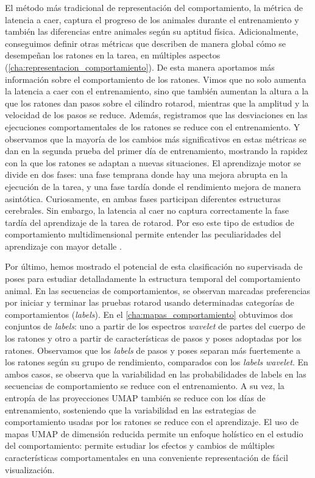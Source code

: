 El método más tradicional de representación del comportamiento, la métrica de latencia a caer, captura el progreso de los animales durante el entrenamiento y también las diferencias entre animales según su aptitud física. Adicionalmente, conseguimos definir otras métricas que describen de manera global cómo se desempeñan los ratones en la tarea, en múltiples aspectos (\autoref{cha:representacion_comportamiento}). De esta manera aportamos más información sobre el comportamiento de los ratones. Vimos que no solo aumenta la latencia a caer con el entrenamiento, sino que también aumentan la altura a la que los ratones dan pasos sobre el cilindro rotarod, mientras que la amplitud y la velocidad de los pasos se reduce. Además, registramos que las desviaciones en las ejecuciones comportamentales de los ratones se reduce con el entrenamiento. Y observamos que la mayoría de los cambios más significativos en estas métricas se dan en la segunda prueba del primer día de entrenamiento, mostrando la rapidez con la que los ratones se adaptan a nuevas situaciones. El aprendizaje motor se divide en dos fases: una fase temprana donde hay una mejora abrupta en la ejecución de la tarea, y una fase tardía donde el rendimiento mejora de manera asintótica. Curiosamente, en ambas fases participan diferentes estructuras cerebrales. Sin embargo, la latencia al caer no captura correctamente la fase tardía del aprendizaje de la tarea de rotarod. Por eso este tipo de estudios de comportamiento multidimensional permite entender las peculiaridades del aprendizaje con mayor detalle \cite{luft_motor_learning}.

Por último, hemos mostrado el potencial de esta clasificación no supervisada de poses para estudiar detalladamente la estructura temporal del comportamiento animal. En las secuencias de comportamientos, se observan marcadas preferencias por iniciar y terminar las pruebas rotarod usando determinadas categorías de comportamientos (\textit{labels}). En el \autoref{cha:mapas_comportamiento} obtuvimos dos conjuntos de \textit{labels}: uno a partir de los espectros \textit{wavelet} de partes del cuerpo de los ratones y otro a partir de características de pasos y poses adoptadas por los ratones. Observamos que los \textit{labels} de pasos y poses separan más fuertemente a los ratones según su grupo de rendimiento, comparados con los \textit{labels} \textit{wavelet}. En ambos casos, se observa que la variabilidad en las probabilidades de labels en las secuencias de comportamiento se reduce con el entrenamiento. A su vez, la entropía de las proyecciones UMAP también se reduce con los días de entrenamiento, sosteniendo que la variabilidad en las estrategias de comportamiento usadas por los ratones se reduce con el aprendizaje. El uso de mapas UMAP de dimensión reducida permite un enfoque holístico en el estudio del comportamiento: permite estudiar los efectos y cambios de múltiples características comportamentales en una conveniente representación de fácil visualización.


